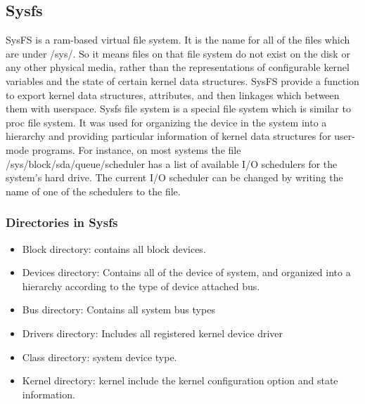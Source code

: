 \documentclass[10pt,draftclsnofoot,journal,compsoc,onecolumn]{IEEEtran}
\begin{document}
\subsection{Sysfs}
\par SysFS is a ram-based virtual file system. It is the name for all of the files which are under /sys/. So it means files on that file system do not exist on the disk or any other physical media, rather than the representations of configurable kernel variables and the state of certain kernel data structures. SysFS provide a function to export kernel data structures, attributes, and then linkages which between them with userspace. Sysfs file system is a special file system which is similar to proc file system. It was used for organizing the device in the system into a hierarchy and providing particular information of kernel data structures for user-mode programs. For instance, on most systems the file /sys/block/sda/queue/scheduler has a list of available I/O schedulers for the system’s hard drive. The current I/O scheduler can be changed by writing the name of one of the schedulers to the file.

\subsubsection{Directories in Sysfs}
\begin{itemize}
\item Block directory: contains all block devices.
\item Devices directory: Contains all of the device of system, and organized into a hierarchy according to the type of device attached bus.
\item Bus directory: Contains all system bus types
\item Drivers directory: Includes all registered kernel device driver
\item Class directory: system device type.
\item Kernel directory: kernel include the kernel configuration option and state information.
\end{itemize}
\end{document}
